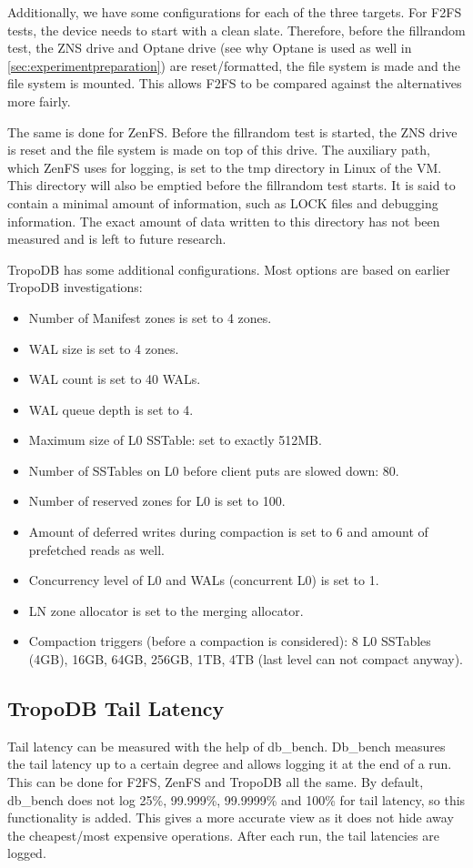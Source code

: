 Additionally, we have some configurations for each of the three targets. For F2FS tests, the device needs to start with a clean slate. Therefore, before the fillrandom test, the ZNS drive and Optane drive (see why Optane is used as well in \autoref{sec:experimentpreparation}) are reset/formatted, the file system is made and the file system is mounted. This allows F2FS to be compared against the alternatives more fairly.

The same is done for ZenFS. Before the fillrandom test is started, the ZNS drive is reset and the file system is made on top of this drive. The auxiliary path, which ZenFS uses for logging, is set to the tmp directory in Linux of the VM. This directory will also be emptied before the fillrandom test starts. It is said to contain a minimal amount of information, such as LOCK files and debugging information. The exact amount of data written to this directory has not been measured and is left to future research.

TropoDB has some additional configurations. Most options are based on earlier TropoDB investigations:
\begin{itemize}
    \item Number of Manifest zones is set to 4 zones.
    \item WAL size is set to 4 zones.
    \item WAL count is set to 40 WALs.
    \item WAL queue depth is set to 4.
    \item Maximum size of L0 SSTable: set to exactly 512MB.  
    \item Number of SSTables on L0 before client puts are slowed down: 80.
    \item Number of reserved zones for L0 is set to 100.
    \item Amount of deferred writes during compaction is set to 6 and amount of prefetched reads as well.
    \item Concurrency level of L0 and WALs (concurrent L0) is set to 1.
    \item LN zone allocator is set to the merging allocator.
    \item Compaction triggers (before a compaction is considered): 8 L0 SSTables (4GB), 16GB, 64GB, 256GB, 1TB, 4TB (last level can not compact anyway).
\end{itemize}

\subsection{TropoDB Tail Latency}
Tail latency can be measured with the help of db\_bench. Db\_bench measures the tail latency up to a certain degree and allows logging it at the end of a run. This can be done for F2FS, ZenFS and TropoDB all the same. By default, db\_bench does not log 25\%, 99.999\%, 99.9999\% and 100\% for tail latency, so this functionality is added. This gives a more accurate view as it does not hide away the cheapest/most expensive operations. After each run, the tail latencies are logged.

